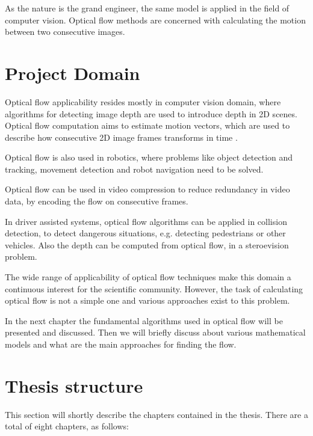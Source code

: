 \documentclass[12pt,a4paper,twoside]{report}
\begin{document}
As the nature is the grand engineer, the same model is applied in the field of computer vision. Optical flow methods are concerned with calculating the motion between two consecutive images. 

\section{Project Domain}
Optical flow applicability resides mostly in computer vision domain, where algorithms for detecting image depth are used to introduce depth in 2D scenes. Optical flow computation  aims to estimate motion vectors, which are used to describe how consecutive 2D image frames transforms in time . 

Optical flow is also used in robotics, where problems like object detection and tracking, movement detection and robot navigation need to be solved.

Optical flow can be used in video compression to reduce redundancy in video data, by encoding the flow on consecutive frames.

In driver assisted systems, optical flow algorithms can be applied in collision detection, to detect dangerous situations, e.g. detecting pedestrians or other vehicles. Also the depth can be computed from optical flow, in a steroevision problem.

The wide range of applicability of optical flow techniques make this domain a continuous interest for the scientific community. However, the task of calculating optical flow is not a simple one and various approaches exist to this problem. 

In the next chapter the fundamental algorithms used in optical flow will be presented and discussed. Then we will briefly discuss about various mathematical models and what are the main approaches for finding the flow.

\section{Thesis structure}
This section will shortly describe the chapters contained in the thesis. There are a total of eight chapters, as follows:
\end{document}
